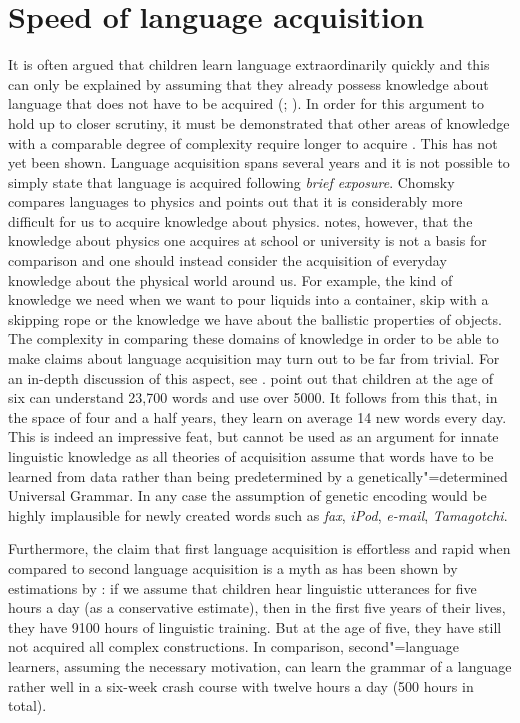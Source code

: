 \section{Speed of language acquisition}
\label{Abschnitt-Geschwindigkeit-Spracherwerb}

It is often argued that children learn language extraordinarily quickly and
this can only be explained by assuming that they already possess knowledge about language that does
not have to be acquired (\eg \citealp[]{Chomsky76c-u}; \citealp[]{Hornstein2013a}).  In order for this argument to hold up to closer scrutiny, it must be demonstrated
that other areas of knowledge with a comparable degree of complexity require longer to acquire
\citep[--218]{Sampson89a}. This has not yet been shown.  Language acquisition spans several
years and it is not possible to simply state that language is acquired following \emph{brief
exposure}.  Chomsky compares languages to physics and points out that it is considerably more
difficult for us to acquire knowledge about physics.  \citet[]{Sampson89a} notes, however,
that the knowledge about physics one acquires at school or university is not a basis for comparison
and one should instead consider the acquisition of everyday knowledge about the physical world around
us.  For example, the kind of knowledge we need when we want to pour liquids into a container, skip
with a skipping rope or the knowledge we have about the ballistic properties of objects. The
complexity in comparing these domains of knowledge in order to be able to make claims about language
acquisition may turn out to be far from trivial.  For an in-depth discussion of this aspect, see
.  \citet[]{MR98a-u} point out that children at the age of
six can understand 23,700 words and use over 5000.  It follows from this that, in the space of four
and a half years, they learn on average 14 new words every day. This is indeed an impressive
feat, but cannot be used as an argument for innate linguistic knowledge as all theories of
acquisition assume that words have to be learned from data rather than being predetermined by a
genetically"=determined Universal Grammar. In any case the assumption of genetic encoding would be highly
implausible for newly created words such as \emph{fax}, \emph{iPod}, \emph{e-mail}, \emph{Tamagotchi}.

Furthermore, the claim that first language acquisition is effortless and rapid when compared to second language acquisition is a myth
as has been shown by estimations by \citet[]{Klein86a-u}: if we assume that children hear linguistic utterances for five hours a day (as a conservative
estimate), then in the first five years of their lives, they have 9100 hours of linguistic training. But at the age of five, they have still not acquired all complex constructions.
In comparison, second"=language learners, assuming the necessary motivation, can learn the grammar of a language rather well in a six-week crash course with
twelve hours a day (500 hours in total).


